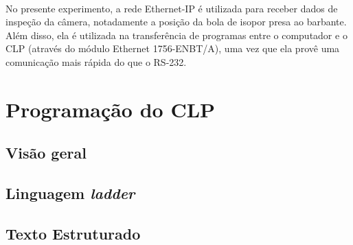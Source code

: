 \paragraph{}No presente experimento, a rede Ethernet-IP é utilizada para receber dados de inspeção da câmera, notadamente a posição da bola de isopor presa ao barbante. Além disso, ela é utilizada na transferência de programas entre o computador e o CLP (através do módulo Ethernet 1756-ENBT/A), uma vez que ela provê uma comunicação mais rápida do que o RS-232.

\begin{comment}
https://en.wikipedia.org/wiki/Industrial_Ethernet
https://en.wikipedia.org/wiki/EtherNet/IP
https://www.odva.org/Technology-Standards/EtherNet-IP/Overview
http://www.rtaautomation.com/technologies/ethernetip/
http://www.rockwellautomation.com/global/products-technologies/integrated-architecture/ethernet-ip.page
http://www.rtaautomation.com/technologies/ethernetip/
\end{comment}

\section{Programação do CLP}
\subsection{Visão geral}

\subsection{Linguagem \textit{ladder}}

\subsection{Texto Estruturado}
